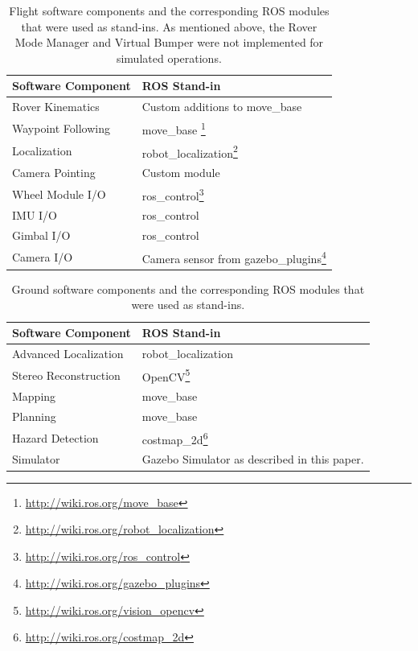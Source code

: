 \documentclass[twocolumn,letterpaper]{IEEEAerospaceCLS}  %
\begin{document}
\begin{table}[htp]
\caption{Flight software components and the corresponding ROS modules that were used as stand-ins.  
As mentioned above, the Rover Mode Manager and Virtual Bumper were not implemented for simulated operations.\label{tbl:flight-software-components}}
\begin{tabular}{l|p{4cm}}
\textbf{Software Component} & \textbf{ROS Stand-in} \\
\hline
Rover Kinematics &  Custom additions to move\_base\\
Waypoint Following & move\_base \footnote{\url{http://wiki.ros.org/move_base}}\\
Localization & robot\_localization\footnote{\url{http://wiki.ros.org/robot_localization}}\\
Camera Pointing & Custom module \\
Wheel Module I/O & ros\_control\footnote{\url{http://wiki.ros.org/ros_control}}\\
IMU I/O & ros\_control\\
Gimbal I/O & ros\_control\\
Camera I/O & Camera sensor from gazebo\_plugins\footnote{\url{http://wiki.ros.org/gazebo_plugins}}\\
\hline
\end{tabular}
\end{table}

\begin{table}[htp]
\caption{Ground software components and the corresponding ROS modules that were used as stand-ins.\label{tbl:ground-software-components}}
\begin{tabular}{l|p{4cm}}
\textbf{Software Component} & \textbf{ROS Stand-in} \\
\hline 
Advanced Localization & robot\_localization\\
Stereo Reconstruction & OpenCV\footnote{\url{http://wiki.ros.org/vision_opencv}}\\
Mapping & move\_base\\
Planning & move\_base\\
Hazard Detection & costmap\_2d\footnote{\url{http://wiki.ros.org/costmap_2d}}\\
Simulator & Gazebo Simulator as described in this paper.\\
\hline
\end{tabular}
\end{table}
\end{document}
